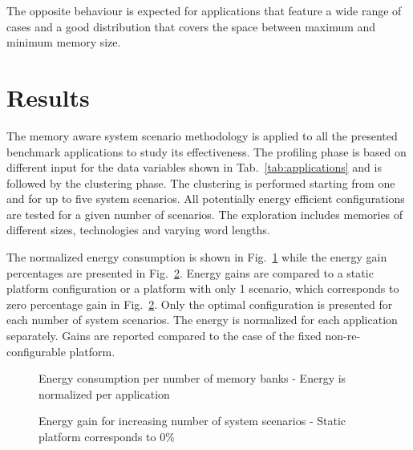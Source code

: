 \documentclass{acm_proc_article-sp}
\begin{document}
The opposite behaviour is expected for applications that feature a wide range of cases and a good distribution that covers the space between maximum and minimum memory size.

\section{Results}
\label{sec:results}

The memory aware system scenario methodology is applied to all the presented benchmark applications to study its effectiveness. The profiling phase is based on different input for the data variables shown in Tab.~\ref{tab:applications} and is followed by the clustering phase. The clustering is performed starting from one and for up to five system scenarios. All potentially energy efficient configurations are tested for a given number of scenarios. The exploration includes memories of different sizes, technologies and varying word lengths. 

The normalized energy consumption is shown in Fig.~\ref{fig:energy} while the energy gain percentages are presented in Fig.~\ref{fig:gains}. Energy gains are compared to a static platform configuration or a platform with only 1 scenario, which corresponds to zero percentage gain in Fig.~\ref{fig:gains}. Only the optimal configuration is presented for each number of system scenarios. The energy is normalized for each application separately. Gains are reported compared to the case of the fixed non-re-configurable platform.

\begin{figure}[!t]
\centering
\caption{Energy consumption per number of memory banks - Energy is normalized per application}
\label{fig:energy}
\end{figure}

\begin{figure}[!t]
\centering
\caption{Energy gain for increasing number of system scenarios - Static platform corresponds to 0\%}
\label{fig:gains}
\end{figure}
\end{document}
